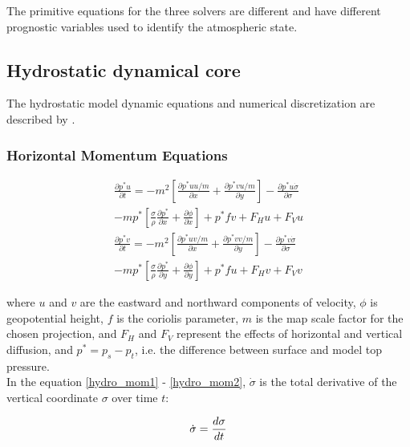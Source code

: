 The primitive equations for the three solvers are different and have different
prognostic variables used to identify the atmospheric state.

\subsection{Hydrostatic dynamical core}
The hydrostatic model dynamic equations and numerical discretization are
described by \cite{Grell_94}.

\subsubsection{Horizontal Momentum Equations}

\begin{gather}
\label{hydro_mom1}
  \frac{\partial{p^{\ast}u}}{\partial{t}} =
  -m^2 \left[ \frac{\partial{p^{\ast}uu/m}}{\partial{x}} + 
    \frac{\partial{p^{\ast}vu/m}}{\partial{y}} \right] -
    \frac{\partial{p^{\ast}u \dot{\sigma}}}{\partial{\sigma}}
      \\ \nonumber
      -mp^{\ast} \left[ \frac{\sigma}{\rho}
      \frac{\partial{p^{\ast}}}{\partial{x}} +
      \frac{\partial{\phi}}{\partial{x}} \right] +
  p^{\ast}fv + F_Hu + F_Vu \\
\label{hydro_mom2}
  \frac{\partial{p^{\ast}v}}{\partial{t}} = 
  -m^2 \left[ \frac{\partial{p^{\ast}uv/m}}{\partial{x}} +
    \frac{\partial{p^{\ast}vv/m}}{\partial{y}} \right] -
    \frac{\partial{p^{\ast}v\dot{\sigma}}}{\partial{\sigma}}
     \\ \nonumber
     -mp^{\ast} \left[ \frac{\sigma}{\rho}
         \frac{\partial{p^{\ast}}}{\partial{y}} +
      \frac{\partial{\phi}}{\partial{y}} \right]
  + p^{\ast}fu + F_Hv + F_Vv
\end{gather}

where $u$ and $v$ are the eastward and northward components of
velocity, $\phi$ is geopotential height, $f$ is the coriolis parameter,
$m$ is the map scale factor for the chosen projection, and $F_H$ and $F_V$
represent the effects of horizontal and vertical diffusion, and
$p^{\ast} = p_s-p_t$, i.e. the difference between surface and model top
pressure.  \\

In the equation \ref{hydro_mom1} - \ref{hydro_mom2}, $\dot{\sigma}$ is the total
derivative of the vertical coordinate $\sigma$ over time $t$:

\begin{equation}
\dot{\sigma} = {d\sigma \over dt}
\end{equation}

